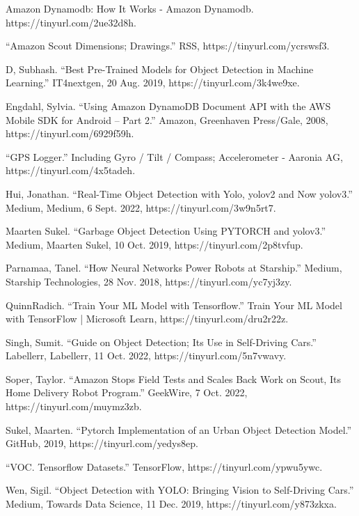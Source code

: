 \documentclass[
  journal=small,
  manuscript=article-type,  %
  year=2022,
  volume=1,
]{cup-journal}
\begin{document}
\newpage
\begin{thebibliography}{9}

Amazon Dynamodb: How It Works - Amazon Dynamodb. https://tinyurl.com/2ue32d8h.

“Amazon Scout Dimensions; Drawings.” RSS, https://tinyurl.com/ycrswsf3.

D, Subhash. “Best Pre-Trained Models for Object Detection in Machine Learning.” IT4nextgen, 20 Aug. 2019, https://tinyurl.com/3k4we9xe.

Engdahl, Sylvia. “Using Amazon DynamoDB Document API with the AWS Mobile SDK for Android – Part 2.” Amazon, Greenhaven Press/Gale, 2008, https://tinyurl.com/6929f59h.

“GPS Logger.” Including Gyro / Tilt / Compass; Accelerometer - Aaronia AG, https://tinyurl.com/4x5tadeh.

Hui, Jonathan. “Real-Time Object Detection with Yolo, yolov2 and Now yolov3.” Medium, Medium, 6 Sept. 2022, https://tinyurl.com/3w9n5rt7. 

Maarten Sukel. “Garbage Object Detection Using PYTORCH and yolov3.” Medium, Maarten Sukel, 10 Oct. 2019, https://tinyurl.com/2p8tvfup. 

Parnamaa, Tanel. “How Neural Networks Power Robots at Starship.” Medium, Starship Technologies, 28 Nov. 2018, https://tinyurl.com/yc7yj3zy. 

QuinnRadich. “Train Your ML Model with Tensorflow.” Train Your ML Model with TensorFlow | Microsoft Learn, https://tinyurl.com/dru2r22z. 

Singh, Sumit. “Guide on Object Detection; Its Use in Self-Driving Cars.” Labellerr, Labellerr, 11 Oct. 2022, https://tinyurl.com/5n7vwavy. 

Soper, Taylor. “Amazon Stops Field Tests and Scales Back Work on Scout, Its Home Delivery Robot Program.” GeekWire, 7 Oct. 2022, https://tinyurl.com/muymz3zb. 

Sukel, Maarten. “Pytorch Implementation of an Urban Object Detection Model.” GitHub, 2019, https://tinyurl.com/yedys8ep. 

“VOC. Tensorflow Datasets.” TensorFlow, https://tinyurl.com/ypwu5ywc. 

Wen, Sigil. “Object Detection with YOLO: Bringing Vision to Self-Driving Cars.” Medium, Towards Data Science, 11 Dec. 2019, https://tinyurl.com/y873zkxa. 

\end{thebibliography}
\end{document}
